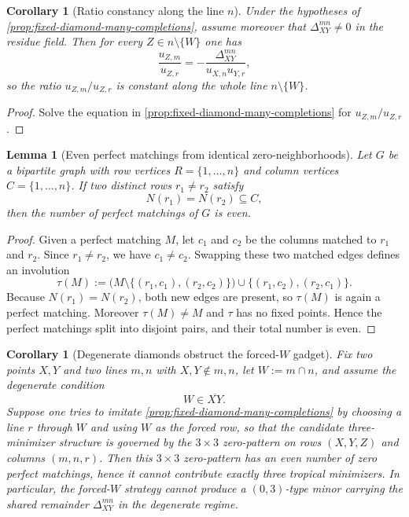 \documentclass[11pt]{amsart}
\numberwithin{equation}{section}
\theoremstyle{plain}
\newtheorem{lemma}[theorem]{Lemma}
\newtheorem{corollary}[theorem]{Corollary}
\theoremstyle{definition}
\theoremstyle{remark}
\begin{document}
\begin{corollary}[Ratio constancy along the line $n$]
\label{cor:fixed-diamond-ratio}
Under the hypotheses of \cref{prop:fixed-diamond-many-completions}, assume moreover that $\Delta_{XY}^{mn}\neq 0$ in the residue field.
Then for every $Z\in n\setminus\{W\}$ one has
\[
\frac{u_{Z,m}}{u_{Z,r}}=-\frac{\Delta_{XY}^{mn}}{u_{X,n}u_{Y,r}},
\]
so the ratio $u_{Z,m}/u_{Z,r}$ is constant along the whole line $n\setminus\{W\}$.
\end{corollary}

\begin{proof}
Solve the equation in \cref{prop:fixed-diamond-many-completions} for $u_{Z,m}/u_{Z,r}$.
\end{proof}

\begin{lemma}[Even perfect matchings from identical zero-neighborhoods]
\label{lem:identical-neighborhood-even}
Let $G$ be a bipartite graph with row vertices $R=\{1,\dots,n\}$ and column vertices $C=\{1,\dots,n\}$. If two distinct rows
$r_1\neq r_2$ satisfy
\[
N(r_1)=N(r_2)\subseteq C,
\]
then the number of perfect matchings of $G$ is even.
\end{lemma}

\begin{proof}
Given a perfect matching $M$, let $c_1$ and $c_2$ be the columns matched to $r_1$ and $r_2$. Since $r_1\neq r_2$, we have
$c_1\neq c_2$. Swapping these two matched edges defines an involution
\[
\tau(M):=\bigl(M\setminus\{(r_1,c_1),(r_2,c_2)\}\bigr)\cup\{(r_1,c_2),(r_2,c_1)\}.
\]
Because $N(r_1)=N(r_2)$, both new edges are present, so $\tau(M)$ is again a perfect matching. Moreover $\tau(M)\neq M$ and
$\tau$ has no fixed points. Hence the perfect matchings split into disjoint pairs, and their total number is even.
\end{proof}

\begin{corollary}[Degenerate diamonds obstruct the forced-$W$ gadget]
\label{cor:degenerate-forcedW-parity}
Fix two points $X,Y$ and two lines $m,n$ with $X,Y\notin m,n$, let $W:=m\cap n$, and assume the degenerate condition
\[
W\in \overline{XY}.
\]
Suppose one tries to imitate \cref{prop:fixed-diamond-many-completions} by choosing a line $r$ through $W$ and using $W$ as the forced
row, so that the candidate three-minimizer structure is governed by the $3\times3$ zero-pattern on rows $(X,Y,Z)$ and columns $(m,n,r)$.
Then this $3\times3$ zero-pattern has an even number of zero perfect matchings, hence it cannot contribute exactly three tropical minimizers.
In particular, the forced-$W$ strategy cannot produce a $(0,3)$-type minor carrying the shared remainder $\Delta_{XY}^{mn}$ in the
degenerate regime.
\end{corollary}
\end{document}
